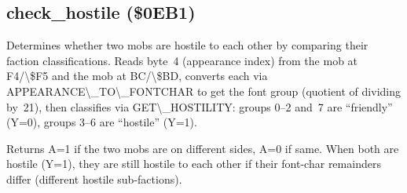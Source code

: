 \documentclass[10pt]{report}
\begin{document}
\nwendcode{}\nwdocspar

\subsection{check\_hostile (\$0EB1)}

Determines whether two mobs are hostile to each other by comparing their
faction classifications.  Reads byte~4 (appearance index) from the mob
at {\Tt{}{\textbackslash}{\$}F4/{\textbackslash}{\$}F5\nwendquote} and the mob at {\Tt{}{\textbackslash}{\$}BC/{\textbackslash}{\$}BD\nwendquote}, converts each via
{\Tt{}APPEARANCE{\textbackslash}{\_}TO{\textbackslash}{\_}FONTCHAR\nwendquote} to get the font group (quotient of dividing
by~21), then classifies via {\Tt{}GET{\textbackslash}{\_}HOSTILITY\nwendquote}: groups 0--2 and~7 are
``friendly'' (Y=0), groups 3--6 are ``hostile'' (Y=1).

Returns {\Tt{}A\nwendquote}=1 if the two mobs are on different sides, {\Tt{}A\nwendquote}=0 if same.
When both are hostile (Y=1), they are still hostile to each other if
their font-char remainders differ (different hostile sub-factions).
\end{document}
